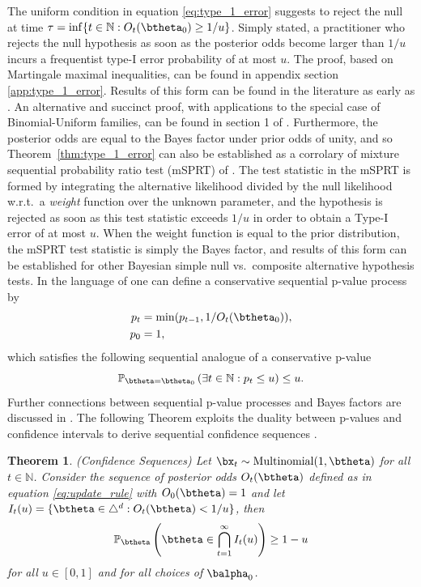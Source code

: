 \documentclass[11pt]{article}
\newtheorem{thm}{Theorem}[section]
\begin{document}
The uniform condition in equation \ref{eq:type_1_error} suggests to reject the null at time $\tau = \inf \lbrace t \in \mathbb{N}: O_t(\btheta_0) \geq 1/u \rbrace$.
Simply stated, a practitioner who rejects the null hypothesis as soon as the posterior odds become larger than $1/u$ incurs a frequentist type-I error probability of at most $u$.
The proof, based on Martingale maximal inequalities, can be found in appendix section \ref{app:type_1_error}.
Results of this form can be found in the literature as early as \cite{ville}.
An alternative and succinct proof, with applications to the special case of Binomial-Uniform families, can be found in section 1 of \cite{robbins}.
Furthermore, the posterior odds are equal to the Bayes factor under prior odds of unity, and so Theorem~\ref{thm:type_1_error} can also be established as a corrolary of mixture sequential probability ratio test (mSPRT) of \cite{wald}.
The test statistic in the mSPRT is formed by integrating the alternative likelihood divided by the null likelihood w.r.t.\ a \textit{weight} function over the unknown parameter, and the hypothesis is rejected as soon as this test statistic exceeds $1/u$ in order to obtain a Type-I error of at most $u$.
When the weight function is equal to the prior distribution, the mSPRT test statistic is simply the Bayes factor, and results of this form can be established for other Bayesian simple null vs.\ composite alternative hypothesis tests.
In the language of \cite{johari} one can define a conservative sequential p-value process by
\begin{align*}
  p_t &= \min(p_{t-1}, 1/O_t(\btheta_0)),\\
  p_0 &=1,
\end{align*}
which satisfies the following sequential analogue of a conservative p-value
\begin{equation}
  \label{eq:conservative_p_value}
  \mathbb{P}_{\btheta = \btheta_0}\left( \exists t \in \mathbb{N}: p_t \leq u \right) \leq u.
\end{equation}
Further connections between sequential p-value processes and Bayes factors are discussed in \cite{shafer}.
The following Theorem exploits the duality between p-values and confidence intervals to derive sequential confidence sequences .
\begin{thm}(Confidence Sequences)
  \label{thm:confidence_sequence}
  \noindent Let $\bx_t\sim \mathrm{Multinomial}(1,\btheta)$ for all $t \in \mathbb{N}$.
Consider the sequence of posterior odds $O_t(\btheta)$ defined as in equation \eqref{eq:update_rule} with $O_0(\btheta)=1$ and
 let $I_t(u) = \lbrace \btheta \in \triangle^d : O_t(\btheta) < 1/u  \rbrace$, then
\begin{equation}
  \label{eq:confidence_sequence}
  \mathbb{P}_{\btheta}\left( \btheta \in \bigcap_{t=1}^{\infty} I_t(u) \right) \geq 1- u
\end{equation}
for all $u \in [0,1]$ and for all choices of $\balpha_0$.
\end{thm}
\end{document}
